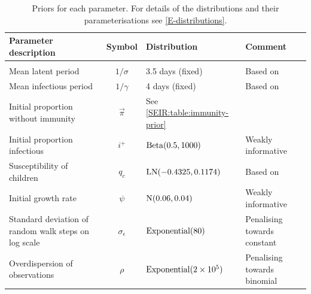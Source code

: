 \documentclass[thesis.tex]{subfiles}
\begin{document}
\begin{landscape}
\begin{table}
\begin{tabular}{l c l l}
    Parameter description & Symbol & Distribution & Comment \\
    \hline \\
    Mean latent period & $1/\sigma$ & 3.5 days (fixed) & Based on \textcite{zhaoEstimating} \\
    Mean infectious period & $1/\gamma$ & 4 days (fixed) & Based on \textcite{zhaoEstimating} \\
    Initial proportion without immunity & $\vec\pi$ & See \cref{SEIR:table:immunity-prior} & \\
    Initial proportion infectious & $i^+$ & $\operatorname{Beta}(0.5, 1000)$ & Weakly informative \\
    Susceptibility of children & $q_c$ & $\operatorname{LN}(-0.4325, 0.1174)$ & Based on \textcite{vinerTransmission}  \\
    Initial growth rate & $\psi$ & $\operatorname{N}(0.06, 0.04)$ & Weakly informative \\
    Standard deviation of random walk steps on log scale & $\sigma_\epsilon$ & $\operatorname{Exponential}(80)$ & Penalising towards constant \\
    Overdispersion of observations & $\rho$ & $\operatorname{Exponential}(2 \times 10^5)$ & Penalising towards binomial
\end{tabular}
\caption[SEIR model priors]{Priors for each parameter. For details of the distributions and their parameterisations see \cref{E-distributions}.}
\label{SEIR:table:priors}
\end{table}


\end{landscape}
\end{document}
